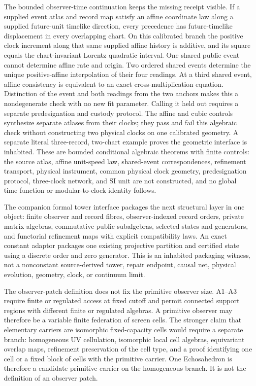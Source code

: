 \documentclass[11pt]{article}
\begin{document}
The bounded observer-time continuation keeps the missing receipt visible. If a supplied
event atlas and record map satisfy an affine coordinate law along a supplied
future-unit timelike direction, every precedence has future-timelike
displacement in every overlapping chart. On this calibrated branch the
positive clock increment along that same supplied affine history is additive,
and its square equals the chart-invariant Lorentz quadratic interval. One
shared public event cannot determine affine rate and origin. Two ordered
shared events determine the unique positive-affine interpolation of their four
readings. At a third shared event, affine consistency is equivalent to an exact
cross-multiplication equation. Distinction of the event and both readings from
the two anchors makes this a nondegenerate check with no new fit parameter.
Calling it held out requires a separate predesignation and custody protocol.
The affine and cubic controls synthesize separate atlases from their clocks;
they pass and fail this algebraic check without constructing two physical
clocks on one calibrated geometry. A separate literal three-record, two-chart
example proves the geometric interface is inhabited. These are bounded
conditional algebraic theorems with finite controls: the source atlas, affine
unit-speed law, shared-event correspondences, refinement transport, physical
instrument, common physical clock geometry, predesignation protocol,
three-clock network, and SI unit are not constructed, and no global time
function or modular-to-clock identity follows.

The companion formal tower interface packages the next structural layer in
one object: finite observer and record fibres, observer-indexed record orders,
private matrix algebras, commutative public subalgebras, selected states and
generators, and functorial refinement maps with explicit compatibility laws.
An exact constant adaptor packages one existing projective partition and
certified state using a discrete order and zero generator. This is an
inhabited packaging witness, not a nonconstant source-derived tower, repair
endpoint, causal net, physical evolution, geometry, clock, or continuum limit.

The observer-patch definition does not fix the primitive observer size. A1--A3 require finite or regulated
access at fixed cutoff and permit connected support regions with different finite or regulated
algebras. A primitive observer may therefore be a variable finite federation of screen cells. The
stronger claim that elementary carriers are isomorphic fixed-capacity cells would require a separate
branch: homogeneous UV cellulation, isomorphic local cell algebras, equivariant overlap maps,
refinement preservation of the cell type, and a proof identifying one cell or a fixed block of cells
with the primitive carrier.
One Echosahedron is therefore a candidate primitive carrier on the homogeneous branch. It is not the
definition of an observer patch.
\end{document}
